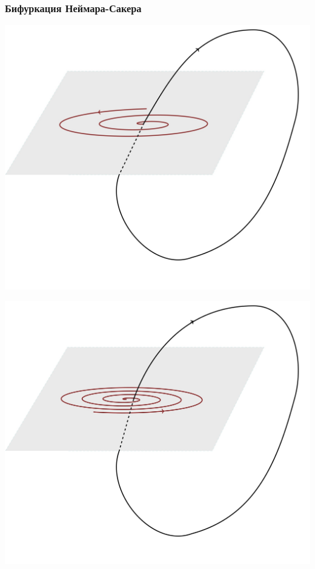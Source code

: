 \subsubsection{Бифуркация Неймара-Сакера}
\begin{center}
    \begin{minipage}{0.32\linewidth}
        \includegraphics[width=\linewidth]{fig/fig74.jpg} 
        \vspace{-30pt}
        \label{fig:1}
    \end{minipage}
\hfill     
    \begin{minipage}{0.3\linewidth}
        \includegraphics[width=\linewidth]{fig/fig75.jpg} 
        \vspace{-30pt}


\end{minipage}
\end{center}
